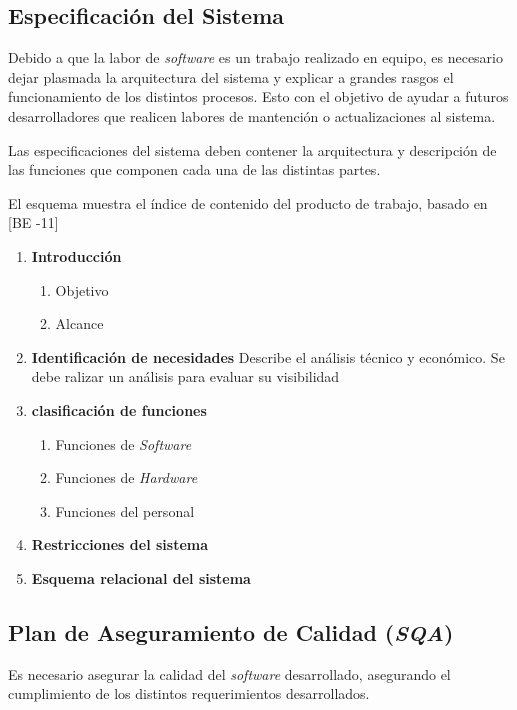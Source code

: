 \subsection{Especificación del Sistema}

Debido a que la labor de \emph{software} es un trabajo realizado en equipo, es necesario dejar plasmada la arquitectura del sistema y explicar a grandes rasgos el funcionamiento de los distintos procesos. Esto con el objetivo de ayudar a futuros desarrolladores que realicen labores de mantención o actualizaciones al sistema.

Las especificaciones del sistema deben contener la arquitectura y descripción de las funciones que componen cada una de las distintas partes.

El esquema muestra el índice de contenido del producto de trabajo, basado en [BE -11]

\begin{framed}
     \begin{enumerate}
		\item \textbf{Introducción}
		\begin{enumerate}
			\item Objetivo
			\item Alcance 
		\end{enumerate}
		\item \textbf{Identificación de necesidades}
		Describe el análisis técnico y económico. Se debe ralizar un análisis para evaluar su visibilidad	
		\item \textbf{clasificación de funciones}
		\begin{enumerate}
			\item Funciones de \emph{Software}
			\item Funciones de \emph{Hardware}
			\item Funciones del personal
		\end{enumerate}		
		\item \textbf{Restricciones del sistema}
		\item \textbf{Esquema relacional del sistema}
	\end{enumerate}
\end{framed}

\subsection{Plan de Aseguramiento de Calidad (\emph{SQA})}
Es necesario asegurar la calidad del \emph{software} desarrollado, asegurando el cumplimiento de los distintos requerimientos desarrollados.

